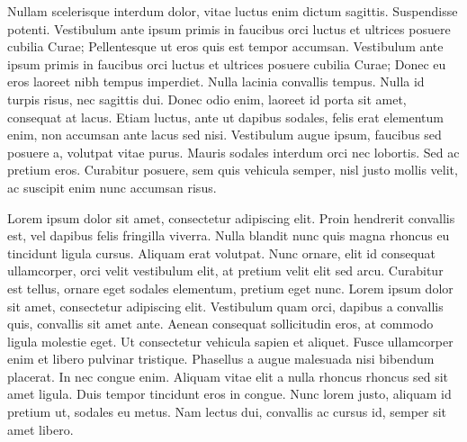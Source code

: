 Nullam scelerisque interdum dolor, vitae luctus enim dictum sagittis. Suspendisse potenti. Vestibulum ante ipsum primis in faucibus orci luctus et ultrices posuere cubilia Curae; Pellentesque ut eros quis est tempor accumsan. Vestibulum ante ipsum primis in faucibus orci luctus et ultrices posuere cubilia Curae; Donec eu eros laoreet nibh tempus imperdiet. Nulla lacinia convallis tempus. Nulla id turpis risus, nec sagittis dui. Donec odio enim, laoreet id porta sit amet, consequat at lacus. Etiam luctus, ante ut dapibus sodales, felis erat elementum enim, non accumsan ante lacus sed nisi. Vestibulum augue ipsum, faucibus sed posuere a, volutpat vitae purus. Mauris sodales interdum orci nec lobortis. Sed ac pretium eros. Curabitur posuere, sem quis vehicula semper, nisl justo mollis velit, ac suscipit enim nunc accumsan risus.

Lorem ipsum dolor sit amet, consectetur adipiscing elit. Proin hendrerit convallis est, vel dapibus felis fringilla viverra. Nulla blandit nunc quis magna rhoncus eu tincidunt ligula cursus. Aliquam erat volutpat. Nunc ornare, elit id consequat ullamcorper, orci velit vestibulum elit, at pretium velit elit sed arcu. Curabitur est tellus, ornare eget sodales elementum, pretium eget nunc. Lorem ipsum dolor sit amet, consectetur adipiscing elit. Vestibulum quam orci, dapibus a convallis quis, convallis sit amet ante. Aenean consequat sollicitudin eros, at commodo ligula molestie eget. Ut consectetur vehicula sapien et aliquet. Fusce ullamcorper enim et libero pulvinar tristique. Phasellus a augue malesuada nisi bibendum placerat. In nec congue enim. Aliquam vitae elit a nulla rhoncus rhoncus sed sit amet ligula. Duis tempor tincidunt eros in congue. Nunc lorem justo, aliquam id pretium ut, sodales eu metus. Nam lectus dui, convallis ac cursus id, semper sit amet libero.

